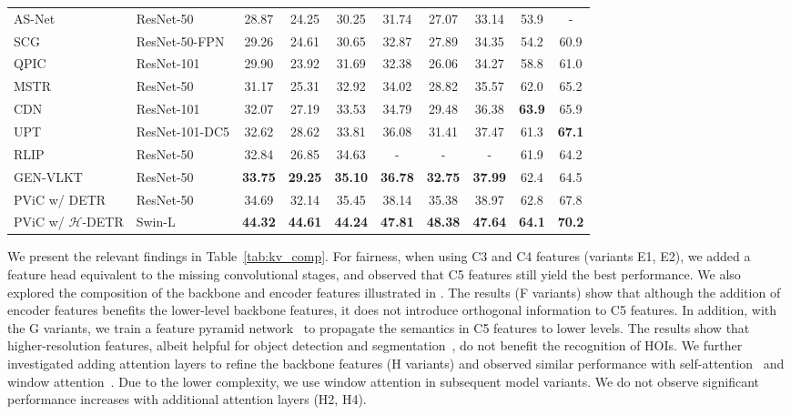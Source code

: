 \documentclass[10pt,twocolumn,letterpaper]{article}
\begin{document}
\begin{table*}[t]
\begin{tabularx}{\linewidth}{@{\extracolsep{\fill}} l l cccccccc}
      AS-Net~\cite{asnet} & ResNet-50 & 28.87 & 24.25 & 30.25 & 31.74 & 27.07 & 33.14 & 53.9 & - \\
      SCG~\cite{scg} & ResNet-50-FPN & 29.26 & 24.61 & 30.65 & 32.87 & 27.89 & 34.35 & 54.2 & 60.9 \\
      QPIC~\cite{qpic} & ResNet-101 & 29.90 & 23.92 & 31.69 & 32.38 & 26.06 & 34.27 & 58.8 & 61.0 \\
      MSTR~\cite{mstr} & ResNet-50 & 31.17 & 25.31 & 32.92 & 34.02 & 28.82 & 35.57 & 62.0 & 65.2 \\
      CDN~\cite{cdn} & ResNet-101 & 32.07 & 27.19 & 33.53 & 34.79 & 29.48 & 36.38 & \textbf{63.9} & 65.9 \\
      UPT~\cite{upt} & ResNet-101-DC5 & 32.62 & 28.62 & 33.81 & 36.08 & 31.41 & 37.47 & 61.3 & \textbf{67.1} \\
      RLIP~\cite{rlip} & ResNet-50 & 32.84 & 26.85 & 34.63 & - & - & - & 61.9 & 64.2 \\
      GEN-VLKT~\cite{gen-vlkt} & ResNet-50 & \textbf{33.75} & \textbf{29.25} & \textbf{35.10} & \textbf{36.78} & \textbf{32.75} & \textbf{37.99} & 62.4 & 64.5 \\
\midrule
     PViC w/ DETR & ResNet-50 & 34.69 & 32.14 & 35.45 & 38.14 & 35.38 & 38.97 & 62.8 & 67.8 \\
     PViC w/ $\mathcal{H}$-DETR & Swin-L & \textbf{44.32} & \textbf{44.61} & \textbf{44.24} & \textbf{47.81} & \textbf{48.38} & \textbf{47.64} & \textbf{64.1} & \textbf{70.2} \\
       \bottomrule
    \end{tabularx}
\end{table*}

We present the relevant findings in Table~\ref{tab:kv_comp}. For fairness, when using C3 and C4 features (variants E1, E2), we added a feature head equivalent to the missing convolutional stages, and observed that C5 features still yield the best performance. We also explored the composition of the backbone and encoder features illustrated in . The results (F variants) show that although the addition of encoder features benefits the lower-level backbone features, it does not introduce orthogonal information to C5 features. In addition, with the G variants, we train a feature pyramid network~\cite{fpn} to propagate the semantics in C5 features to lower levels. The results show that higher-resolution features, albeit helpful for object detection and segmentation~\cite{detr, ta-fcn}, do not benefit the recognition of HOIs. We further investigated adding attention layers to refine the backbone features (H variants) and observed similar performance with self-attention~\cite{xfmer} and window attention~\cite{swint}. Due to the lower complexity, we use window attention in subsequent model variants.
We do not observe significant performance increases with additional attention layers (H2, H4).
\end{document}
